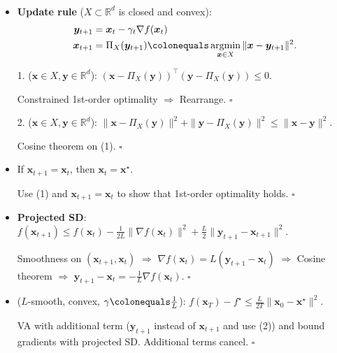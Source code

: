 \documentclass[8pt,a4paper]{extarticle}
\renewcommand{\proof}[1]{\begin{tcolorbox}#1 \hfill $\square$\end{tcolorbox}}
\DeclareMathOperator*{\argmin}{argmin}
\newcommand{\R}{\mathbb{R}}
\renewcommand{\vec}[1]{\bm{#1}}
\newenvironment{topic}[1]
{\textbf{\sffamily \colorbox{black}{\rlap{\textbf{\textcolor{white}{#1}}}\hspace{\linewidth}\hspace{-2\fboxsep}}} \\ \vspace{0.2cm}}
{}
\begin{document}
\begin{multicols*}{2}
    \begin{topic}{Projected gradient descent}
        \begin{itemize}
            \item \textbf{Update rule} ($X \subset \R^d$ is closed and convex):
                  \begin{align*}
                      \vec{y}_{t+1} & = \vec{x}_t - \gamma_t \nabla f(\vec{x}_t)                                                   \\
                      \vec{x}_{t+1} & = \Pi_X(\vec{y}_{t+1}) \colonequals \argmin_{\vec{x} \in X} \| \vec{x} - \vec{y}_{t+1} \|^2.
                  \end{align*}
            \item[1.] ($\vec{x} \in X, \vec{y} \in \R^d$): $(\vec{x} - \Pi_X(\vec{y}))^\top (\vec{y} - \Pi_X(\vec{y})) \leq 0$.
                  \proof{Constrained 1st-order optimality $\Rightarrow$ Rearrange.}
            \item[2.] ($\vec{x} \in X, \vec{y} \in \R^d$): $\| \vec{x} - \Pi_X(\vec{y}) \|^2 + \| \vec{y} - \Pi_X(\vec{y}) \|^2 \leq \| \vec{x} - \vec{y} \|^2$.
                  \proof{Cosine theorem on (1).}
            \item If $\vec{x}_{t+1} = \vec{x}_t$, then $\vec{x}_t = \vec{x}^\star$. \proof{Use (1) and $\vec{x}_{t+1}
                          = \vec{x}_t$ to show that 1st-order optimality holds.}
            \item \textbf{Projected SD}: $f(\vec{x}_{t+1}) \leq f(\vec{x}_t) - \frac{1}{2L} \| \nabla f(\vec{x}_t) \|^2 + \frac{L}{2} \| \vec{y}_{t+1} - \vec{x}_{t+1} \|^2$.
                  \proof{Smoothness on $(\vec{x}_{t+1}, \vec{x}_t)$ $\Rightarrow$ $\nabla f(\vec{x}_t) = L(\vec{y}_{t+1} - \vec{x}_t)$ $\Rightarrow$ Cosine theorem $\Rightarrow$ $\vec{y}_{t+1} - \vec{x}_t = -\frac{1}{L} \nabla f(\vec{x}_t)$.}
            \item ($L$-smooth, convex, $\gamma \colonequals \frac{1}{L}$): $f(\vec{x}_T) - f^\star \leq \frac{L}{2T} \| \vec{x}_0 - \vec{x}^\star \|^2$.
                  \proof{VA with additional term ($\vec{y}_{t+1}$ instead of $\vec{x}_{t+1}$ and use (2)) and bound gradients with projected SD. Additional terms cancel.}
        \end{itemize}
    \end{topic}


\end{multicols*}
\end{document}
